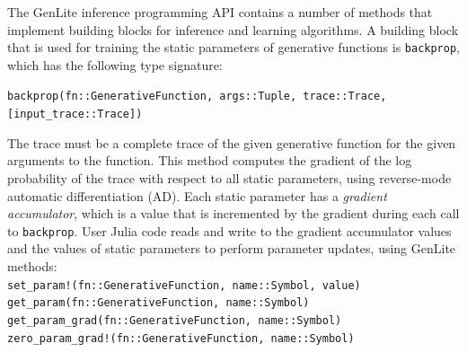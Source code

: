 \documentclass{article}
\begin{document}
The GenLite inference programming API contains a number of methods that implement building blocks for inference and learning algorithms.
A building block that is used for training the static parameters of generative functions is \texttt{backprop}, which has the following type signature:
\begin{center}
    \texttt{backprop(fn::GenerativeFunction, args::Tuple, trace::Trace, [input\_trace::Trace])}
\end{center}
The trace must be a complete trace of the given generative function for the given arguments to the function.
This method computes the gradient of the log probability of the trace with respect to all static parameters, using reverse-mode automatic differentiation (AD).
Each static parameter has a \emph{gradient accumulator}, which is a value that is incremented by the gradient during each call to \texttt{backprop}.
User Julia code reads and write to the gradient accumulator values and the values of static parameters to perform parameter updates, using GenLite methods:\\
\texttt{set\_param!(fn::GenerativeFunction, name::Symbol, value)}\\
\texttt{get\_param(fn::GenerativeFunction, name::Symbol)}\\
\texttt{get\_param\_grad(fn::GenerativeFunction, name::Symbol)}\\
\texttt{zero\_param\_grad!(fn::GenerativeFunction, name::Symbol)}
\end{document}
